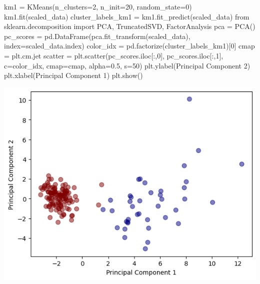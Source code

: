 \documentclass[
  11pt,
  letterpaper,
  DIV=11,
  numbers=noendperiod]{scrartcl}
\newenvironment{Shaded}{\begin{snugshade}}{\end{snugshade}}
\newcommand{\DecValTok}[1]{\textcolor[rgb]{0.68,0.00,0.00}{#1}}
\newcommand{\FloatTok}[1]{\textcolor[rgb]{0.68,0.00,0.00}{#1}}
\newcommand{\ImportTok}[1]{\textcolor[rgb]{0.00,0.46,0.62}{#1}}
\newcommand{\NormalTok}[1]{\textcolor[rgb]{0.00,0.23,0.31}{#1}}
\newcommand{\OperatorTok}[1]{\textcolor[rgb]{0.37,0.37,0.37}{#1}}
\newcommand{\StringTok}[1]{\textcolor[rgb]{0.13,0.47,0.30}{#1}}
\begin{document}
\begin{Shaded}
\begin{Highlighting}[]
\NormalTok{km1 }\OperatorTok{=}\NormalTok{ KMeans(n\_clusters}\OperatorTok{=}\DecValTok{2}\NormalTok{, n\_init}\OperatorTok{=}\DecValTok{20}\NormalTok{, random\_state}\OperatorTok{=}\DecValTok{0}\NormalTok{)}
\NormalTok{km1.fit(scaled\_data)}
\NormalTok{cluster\_labels\_km1 }\OperatorTok{=}\NormalTok{ km1.fit\_predict(scaled\_data)}
\ImportTok{from}\NormalTok{ sklearn.decomposition }\ImportTok{import}\NormalTok{ PCA, TruncatedSVD, FactorAnalysis}
\NormalTok{pca }\OperatorTok{=}\NormalTok{ PCA()}
\NormalTok{pc\_scores }\OperatorTok{=}\NormalTok{ pd.DataFrame(pca.fit\_transform(scaled\_data), index}\OperatorTok{=}\NormalTok{scaled\_data.index)}
\NormalTok{color\_idx }\OperatorTok{=}\NormalTok{ pd.factorize(cluster\_labels\_km1)[}\DecValTok{0}\NormalTok{]}
\NormalTok{cmap }\OperatorTok{=}\NormalTok{ plt.cm.jet}
\NormalTok{scatter }\OperatorTok{=}\NormalTok{ plt.scatter(pc\_scores.iloc[:,}\DecValTok{0}\NormalTok{], pc\_scores.iloc[:,}\DecValTok{1}\NormalTok{], c}\OperatorTok{=}\NormalTok{color\_idx, cmap}\OperatorTok{=}\NormalTok{cmap, alpha}\OperatorTok{=}\FloatTok{0.5}\NormalTok{, s}\OperatorTok{=}\DecValTok{50}\NormalTok{)}
\NormalTok{plt.ylabel(}\StringTok{\textquotesingle{}Principal Component 2\textquotesingle{}}\NormalTok{)}
\NormalTok{plt.xlabel(}\StringTok{\textquotesingle{}Principal Component 1\textquotesingle{}}\NormalTok{)}
\NormalTok{plt.show()}
\end{Highlighting}
\end{Shaded}

\includegraphics{Seebach_Lily_HW6_files/figure-pdf/cell-15-output-1.png}
\end{document}

